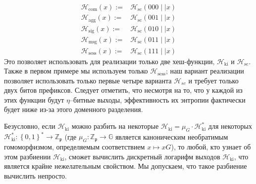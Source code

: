 \documentclass{mrl}
\theoremstyle{definition}
\numberwithin{theorem}{subsection}
\newcommand{\scalarField}{\mathbb{Z}_{\mathfrak{p}}}
\newcommand{\group}{\mathbb{G}}
\newcommand{\m}{\mathfrak{m}}
\begin{document}
\begin{align*}
\mathcal{H}_{\text{com}}(x) :=& \mathcal{H}_{\text{sc}}(000 \mid \mid x)\\
\mathcal{H}_{\text{agg}}(x) :=& \mathcal{H}_{\text{sc}}(001 \mid \mid x) \\
\mathcal{H}_{\text{sig}}(x) :=& \mathcal{H}_{\text{sc}}(010\mid \mid x) \\
\mathcal{H}_{\text{msg}}(x) :=& \mathcal{H}_{\text{sc}}(011\mid \mid x) \\
\mathcal{H}_{\text{sess}}(x) :=& \mathcal{H}_{\text{sc}}(111\mid \mid x)
\end{align*} Это позволяет использовать для реализации только две хеш-функции, $\mathcal{H}_{\text{ki}}$ и $\mathcal{H}_{\text{sc}}$. Также в первом примере мы используем только $\mathcal{H}_{\text{sess}}$; наш вариант реализации позволяет использовать только первые четыре варианта $\mathcal{H}_{sc}$ и требует только двух битов префиксов. Следует отметить, что несмотря на то, что у каждой из этих функции будут $\eta$--битные выходы, эффективность их энтропии фактически будет ниже из-за этого доменного разделения. %

Безусловно, если $\mathcal{H}_{\text{ki}}$ можно разбить на некоторые $\mathcal{H}_{\text{ki}} = \mu_G \cdot \mathcal{H}_{\text{ki}}^*$ для некоторых $\mathcal{H}_{\text{ki}}^*:\left\{0,1\right\}^* \to \scalarField$ (где $\mu_G: \scalarField \to \group$ является каноническим необратимым гомоморфизмом, определяемым соответствием $x \mapsto xG$), то любой, кто узнает об этом разбиении $\mathcal{H}_{\text{ki}}$, сможет вычислить дискретный логарифм выходов $\mathcal{H}_{\text{ki}}$, что является крайне нежелательным свойством. Мы допускаем, что такое разбиение вычислить непросто.

\end{document}
